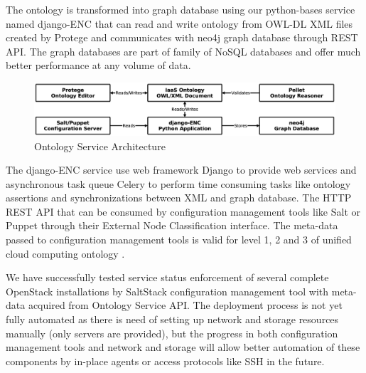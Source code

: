 The ontology is transformed into graph database using our python-bases service named django-ENC that can read and write ontology from OWL-DL XML files created by Protege and communicates with neo4j graph database through REST API. The graph databases are part of family of NoSQL databases and offer much better performance at any volume of data.

\begin{figure}[!h]
\centering
\includegraphics[scale=.17]{img/django_enc_arch.eps}
\caption{Ontology Service Architecture}
\label{fig:cm}
\end{figure}

The django-ENC service use web framework Django to provide web services and asynchronous task queue Celery to perform time consuming tasks like ontology assertions and synchronizations between XML and graph database. The HTTP REST API that can be consumed by configuration management tools like Salt or Puppet through their External Node Classification interface. The meta-data passed to configuration management tools is valid for level 1, 2 and 3 of unified cloud computing ontology \cite{OntologyComputing}. 

We have successfully tested service status enforcement of several complete OpenStack installations by SaltStack configuration management tool with meta-data acquired from Ontology Service API. The deployment process is not yet fully automated as there is need of setting up network and storage resources manually (only servers are provided), but the progress in both configuration management tools and network and storage will allow better automation of these components by in-place agents or access protocols like SSH in the future.





